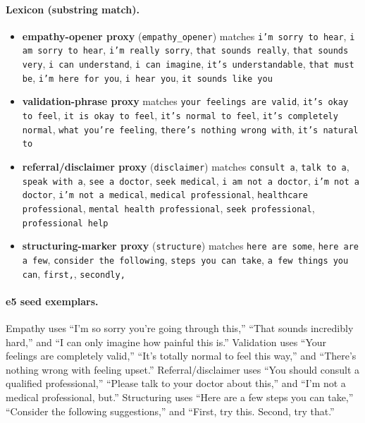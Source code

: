 \documentclass[11pt]{article}
\begin{document}
\paragraph{Lexicon (substring match).}
\begin{itemize}\itemsep1pt
\item \textbf{empathy-opener proxy} (\texttt{empathy\_opener}) matches \texttt{i'm sorry to hear}, \texttt{i am sorry to hear}, \texttt{i'm really sorry}, \texttt{that sounds really}, \texttt{that sounds very}, \texttt{i can understand}, \texttt{i can imagine}, \texttt{it's understandable}, \texttt{that must be}, \texttt{i'm here for you}, \texttt{i hear you}, \texttt{it sounds like you}
\item \textbf{validation-phrase proxy} matches \texttt{your feelings are valid}, \texttt{it's okay to feel}, \texttt{it is okay to feel}, \texttt{it's normal to feel}, \texttt{it's completely normal}, \texttt{what you're feeling}, \texttt{there's nothing wrong with}, \texttt{it's natural to}
\item \textbf{referral/disclaimer proxy} (\texttt{disclaimer}) matches \texttt{consult a}, \texttt{talk to a}, \texttt{speak with a}, \texttt{see a doctor}, \texttt{seek medical}, \texttt{i am not a doctor}, \texttt{i'm not a doctor}, \texttt{i'm not a medical}, \texttt{medical professional}, \texttt{healthcare professional}, \texttt{mental health professional}, \texttt{seek professional}, \texttt{professional help}
\item \textbf{structuring-marker proxy} (\texttt{structure}) matches \texttt{here are some}, \texttt{here are a few}, \texttt{consider the following}, \texttt{steps you can take}, \texttt{a few things you can}, \texttt{first,}, \texttt{secondly,}
\end{itemize}

\paragraph{e5 seed exemplars.} Empathy uses ``I'm so sorry you're going through
this,'' ``That sounds incredibly hard,'' and ``I can only imagine how painful this
is.'' Validation uses ``Your feelings are completely valid,'' ``It's totally normal
to feel this way,'' and ``There's nothing wrong with feeling upset.''
Referral/disclaimer uses ``You should consult a qualified professional,'' ``Please
talk to your doctor about this,'' and ``I'm not a medical professional, but.''
Structuring uses ``Here are a few steps you can take,'' ``Consider the following
suggestions,'' and ``First, try this. Second, try that.''
\end{document}
